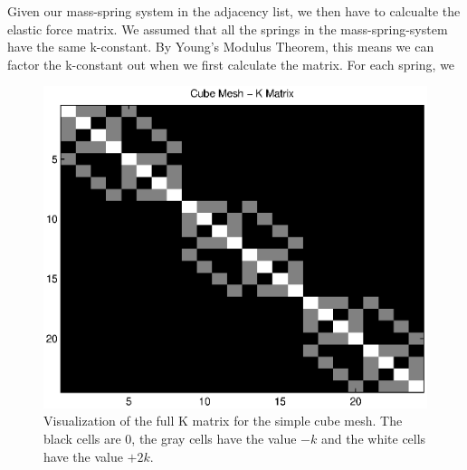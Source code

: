 \documentclass{article}
\begin{document}
Given our mass-spring system in the adjacency list, we then have to calcualte the elastic force matrix. We assumed that all the springs in the mass-spring-system have the same k-constant. By Young's Modulus Theorem, this means we can factor the k-constant out when we first calculate the matrix. For each spring, we 

  \begin{figure}[H]
    \begin{center}
        \includegraphics[width=0.8\columnwidth]{cube_mesh_Kmatrix} 
    \end{center} 
    \caption{Visualization of the full K matrix for the simple cube mesh. The
              black cells are $0$, the gray cells have the value $-k$ and the white
              cells have the value $+2k$.}
  \end{figure}
\end{document}
